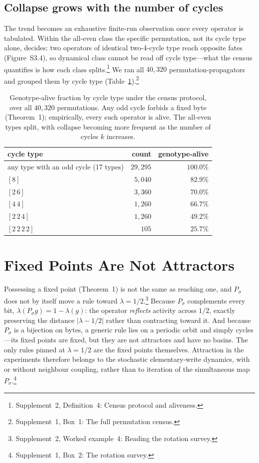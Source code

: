 \documentclass[man,12pt,floatsintext,donotrepeattitle]{apa7}
\newcommand{\sig}{\sigma}
\newcommand{\suppfindingref}[1]{Supplement~1, Box~#1}
\newcommand{\supptheorytext}[2]{Supplement~2, #1: #2.}
\newcommand{\supptheory}[2]{\footnote{\supptheorytext{#1}{#2}}}
\newcommand{\suppfindingtext}[2]{\suppfindingref{#1}: #2.}
\newcommand{\suppfinding}[2]{\footnote{\suppfindingtext{#1}{#2}}}
\begin{document}
\subsection{Collapse grows with the number of cycles}
\label{sec:full-census}

The trend becomes an exhaustive finite-run observation once every operator is tabulated. Within the all-even class the specific permutation, not its cycle type alone, decides: two operators of identical two-4-cycle type reach opposite fates (Figure~S3.4), so dynamical class cannot be read off cycle type---what the census quantifies is how each class splits.\supptheory{Definition~4}{Census protocol and aliveness} We ran all
$40{,}320$ permutation-propagators and grouped them by cycle type
(Table~\ref{tab:census}).\suppfinding{1}{The full permutation census}

\begin{table}[t]
\centering\small
\caption{Genotype-alive fraction by cycle type under the census protocol, over
all $40{,}320$ permutations. Any odd cycle forbids a fixed byte
(Theorem~1); empirically, every such operator is alive. The
all-even types split, with collapse becoming more frequent as the number of
cycles $k$ increases.}
\label{tab:census}
\begin{tabular}{lrr}
\toprule
cycle type & count & genotype-alive \\
\midrule
any type with an odd cycle (17 types) & $29{,}295$ & $100.0\%$ \\
$[8]$        & $5{,}040$ & $82.9\%$ \\
$[2\,6]$     & $3{,}360$ & $70.0\%$ \\
$[4\,4]$     & $1{,}260$ & $66.7\%$ \\
$[2\,2\,4]$  & $1{,}260$ & $49.2\%$ \\
$[2\,2\,2\,2]$ & $105$   & $25.7\%$ \\
\bottomrule
\end{tabular}
\end{table}

\section{Fixed Points Are Not Attractors}
\label{sec:interrupter}

Possessing a fixed point (Theorem~1) is not the same as
reaching one, and $P_\sig$ does not by itself move a rule toward
$\lambda = 1/2$.\supptheory{Worked example~4}{Reading the rotation survey} Because $P_\sig$ complements every bit,
$\lambda(P_\sig g) = 1 - \lambda(g)$: the operator \emph{reflects} activity
across $1/2$, exactly preserving the distance $\lvert\lambda - 1/2\rvert$
rather than contracting toward it. And because $P_\sig$ is a bijection on
bytes, a generic rule lies on a periodic orbit and simply cycles---its fixed
points are fixed, but they are not attractors and have no basins. The only
rules pinned at $\lambda = 1/2$ are the fixed points themselves. Attraction in
the experiments therefore belongs to the stochastic elementary-write dynamics,
with or without neighbour coupling, rather than to iteration of the simultaneous
map $P_\sig$.\suppfinding{2}{The rotation survey}
\end{document}
